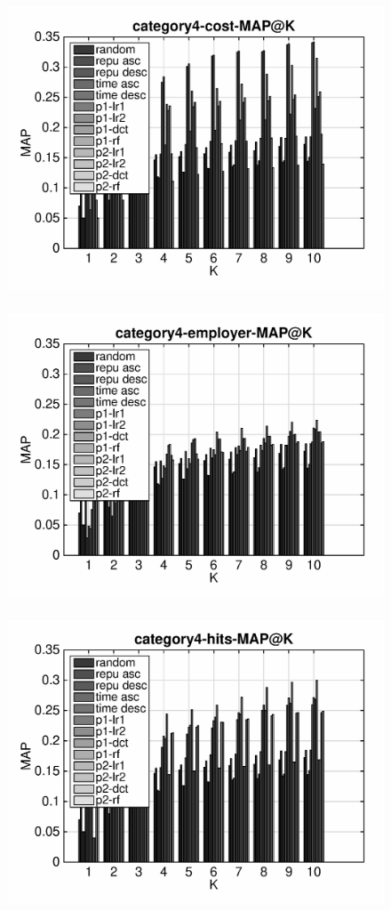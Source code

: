\documentclass{article}
\begin{document}
\begin{figure}[ht]
\begin{flushleft}
\includegraphics[width=18cm,height=9cm]{category4-cost-MAP@K.eps}
\includegraphics[width=18cm,height=9cm]{category4-employer-MAP@K.eps}
\includegraphics[width=18cm,height=9cm]{category4-hits-MAP@K.eps}
\end{flushleft}
\end{figure}
\end{document}
